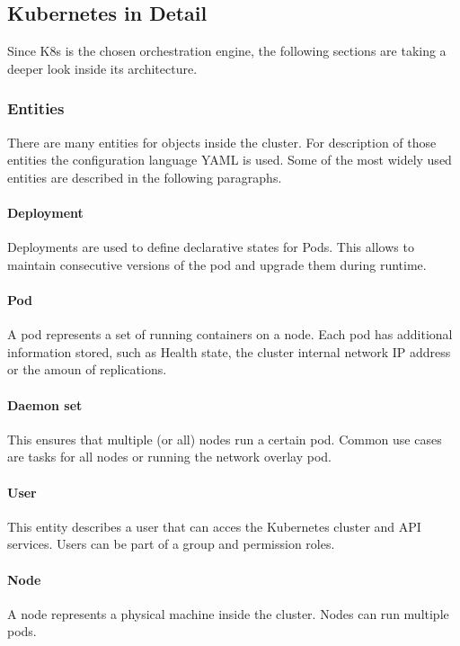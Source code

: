 \subsection{Kubernetes in Detail}
Since \ac{K8s} is the chosen orchestration engine, the following sections are taking a deeper look inside its architecture.

\subsubsection{Entities}
There are many entities for objects inside the cluster. For description of those entities the configuration language YAML is used. Some of the most widely used entities are described in the following paragraphs.
\paragraph{Deployment} Deployments are used to define declarative states for Pods. This allows to maintain consecutive versions of the pod and upgrade them during runtime.
\paragraph{Pod} A pod represents a set of running containers on a node. Each pod has additional information stored, such as Health state, the cluster internal network IP address or the amoun of replications.
\paragraph{Daemon set} This ensures that multiple (or all) nodes run a certain pod\cite{Kubernetes.20220831}. Common use cases are tasks for all nodes or running the network overlay pod.
\paragraph{User} This entity describes a user that  can acces the Kubernetes cluster and API services. Users can be part of a group and permission roles.
\paragraph{Node} A node represents a physical machine inside the cluster. Nodes can run multiple pods.

